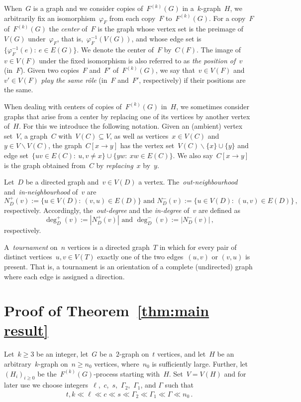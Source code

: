 \documentclass[oneside, 12pt]{amsart}
\numberwithin{equation}{section}
\numberwithin{figure}{section}
\let\setminus=\smallsetminus
\theoremstyle{plain}
\theoremstyle{note}
\theoremstyle{remark}
\begin{document}
    When~$G$ is a graph and we consider copies of~$F^{(k)}(G)$ in a~$k$-graph~$H$, we arbitrarily fix an isomorphism~$\varphi_F$ from each copy~$F$ to~$F^{(k)}(G)$.
    For a copy~$F$ of~$F^{(k)}(G)$ the \emph{center} of~$F$ is the graph whose vertex set is the preimage of~$V(G)$ under~$\varphi_F$, that is,~$\varphi_F^{-1}(V(G))$, and whose edge set is~$\big\{\varphi_F^{-1}(e):\:e\in E(G)\big\}$.
    We denote the center of~$F$ by~$C(F)$.
    The image of~$v\in V(F)$ under the fixed isomorphism is also referred to as \emph{the position of~$v$} (in~$F$).
    Given two copies~$F$ and~$F'$ of~$F^{(k)}(G)$, we say that~$v\in V(F)$ and~$v'\in V(F)$ \emph{play the same r\^ole} (in~$F$ and~$F'$, respectively) if their positions are the same.

    When dealing with centers of copies of~$F^{(k)}(G)$ in~$H$, we sometimes consider graphs that arise from a center by replacing one of its vertices by another vertex of~$H$.
    For this we introduce the following notation.
    Given an (ambient) vertex set~$V$, a graph~$C$ with~$V(C)\subseteq V$, as well as vertices~$x\in V(C)$ and~$y\in V\setminus V(C)$, the graph~$C[x\to y]$ has the vertex set~$V(C)\setminus\{x\}\cup\{y\}$ and edge set~$\{uv\in E(C):\: u,v\neq x\} \cup \{yw:\:xw\in E(C)\}$.
	We also say~$C[x\to y]$ is the graph obtained from~$C$ by \emph{replacing}~$x$ by~$y$.

    Let~$D$ be a directed graph and~$v \in V(D)$ a vertex.
    The~\emph{out-neighbourhood} and~\emph{in-neighbourhood} of~$v$ are
	\[
	N^+_D(v) := \{ u \in V(D) :\: (v,u) \in E(D) \} \text{ and }
	N^-_D(v) := \{ u \in V(D) :\: (u,v) \in E(D) \}\,,
	\]
	respectively.
	Accordingly, the~\emph{out-degree} and the \emph{in-degree} of~$v$ are defined as
	\[
	\deg^+_D(v) := |N^+_D(v)|\text{ and }
	\deg^-_D(v) := |N^-_D(v)|\,,
	\]
	respectively.
	
	A~\emph{tournament} on~$n$ vertices is a directed graph~$T$ in which for every pair of distinct vertices~$u,v \in V(T)$ exactly one of the two edges~$(u,v)$ or $(v,u)$ is present.
	That is, a tournament is an orientation of a complete (undirected) graph where each edge is assigned a direction.
	
	\section{Proof of Theorem~\ref{thm:main result}}\label{sec:main proof}
	Let~$k\geq3$ be an integer, let~$G$ be a~$2$-graph on~$t$ vertices, and let~$H$ be an arbitrary~$k$-graph on~$n\geq n_0$ vertices, where~$n_0$ is sufficiently large.
	Further, let~$(H_i)_{i \geq 0}$ be the~$F^{(k)}(G)$-process starting with~$H$.
	Set~$V=V(H)$ and for later use we choose integers~$\ell$,~$c$,~$s$,~$\Gamma_2$,~$\Gamma_1$, and $\Gamma$ such that
	\begin{align}\label{eq:hierarchy}
		t,k \ll \ell \ll c \ll s \ll \Gamma_2 \ll \Gamma_1 \ll \Gamma \ll n_0\,.
	\end{align}
	
\end{document}
